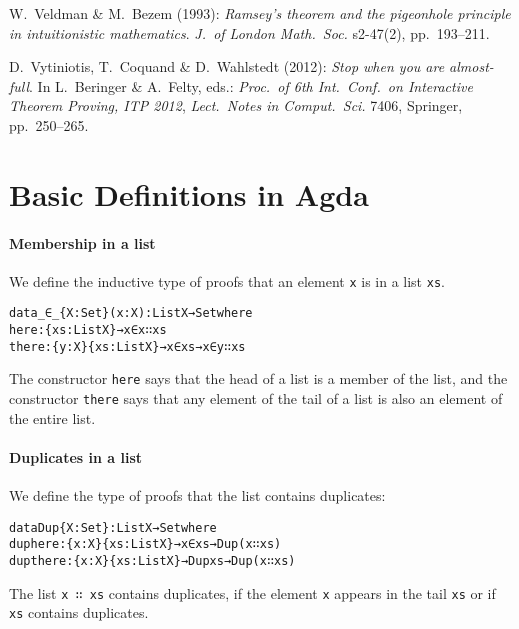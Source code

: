 \documentclass{eptcs}
\begin{document}
\begin{thebibliography}{20}
 W.~Veldman \& M.~Bezem (1993):
\newblock \emph{Ramsey’s theorem and the pigeonhole principle in intuitionistic mathematics}.
\newblock \textsl{J.\ of London Math.\ Soc.} s2-47(2), pp.~193--211.

 D.~Vytiniotis, T.~Coquand \& D.~Wahlstedt (2012):
\newblock \emph{Stop when you are almost-full}.
\newblock In L.~Beringer \& A.~Felty, eds.: \textsl{Proc.\ of 6th Int.\ Conf.\ on Interactive Theorem Proving, ITP 2012}, \textsl{Lect.\ Notes in Comput.\ Sci.} 7406, Springer, pp.~250--265. 

\end{thebibliography}

 

\appendix

\section{Basic Definitions in Agda}
\label{basic-definitions-in-agda}

\paragraph{Membership in a list} We define the inductive type of proofs that an element
\verb;x; is in a list \verb;xs;.
\begin{alltt}
data  _∈_ \{X : Set\} (x : X) : List X → Set where
  here  : \{xs : List X\} → x ∈ x ∷ xs
  there : \{y : X\} \{xs : List X\} → x ∈ xs → x ∈ y ∷ xs
\end{alltt}
The constructor \verb;here; says that the head of a list is a member of
the list, and the constructor \verb;there; says that any element of the tail of a
list is also an element of the entire list.
\paragraph{Duplicates in a list} We define the type of proofs that the list contains duplicates:
\begin{alltt}
data Dup \{X : Set\} : List X → Set where
  duphere  : \{x : X\} \{xs : List X\} → x ∈ xs → Dup (x ∷ xs)
  dupthere : \{x : X\} \{xs : List X\} → Dup xs → Dup (x ∷ xs)
\end{alltt}
The list \verb;x ∷ xs; contains duplicates, if the element \verb;x; appears
in the tail \verb;xs; or if \verb;xs; contains duplicates.
\end{document}
